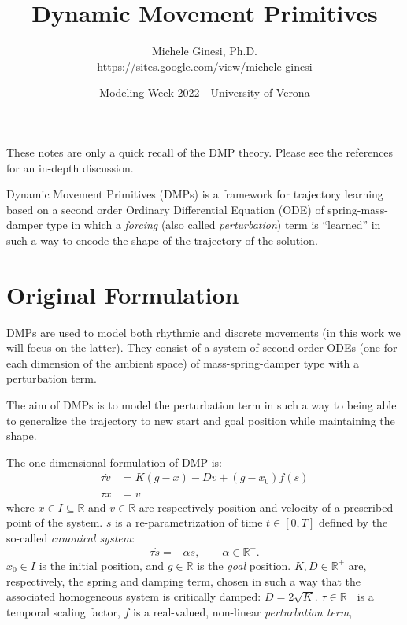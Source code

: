 \documentclass[fleqn, 11pt]{article}
\title{Dynamic Movement Primitives}
\author{Michele Ginesi, Ph.D. \\ \href{https://sites.google.com/view/michele-ginesi}{https://sites.google.com/view/michele-ginesi}}
\date{Modeling Week 2022 - University of Verona}
\theoremstyle{definition}
\theoremstyle{plain}
\theoremstyle{remark}
\begin{document}
\maketitle
\begin{center}
    These notes are only a quick recall of the DMP theory.
    Please see the references for an in-depth discussion.
\end{center}
\hrulefill

\vspace{0.5cm}
Dynamic Movement Primitives (DMPs) is a framework for trajectory learning based on a second order Ordinary Differential Equation (ODE) of spring-mass-damper type in which a \emph{forcing} (also called \emph{perturbation}) term is ``learned'' in such a way to encode the shape of the trajectory of the solution.

\section{Original Formulation}\label{subsec:dmp_old}

DMPs \cite{INS02, INS03} are used to model both rhythmic and discrete movements (in this work we will focus on the latter).
They consist of a system of second order ODEs (one for each dimension of the ambient space) of mass-spring-damper type with a perturbation term.

The aim of DMPs is to model the perturbation term in such a way to being able to generalize the trajectory to new start and goal position while maintaining the shape.

The one-dimensional formulation of DMP is:
\begin{subequations}
    \label{eqs:dmp_old_form}
    \begin{align}
        \tau \dot{v} & = K (g - x) - Dv + (g- x_0)f(s) \label{eq:dmp_old_form_acc}\\
        \tau \dot{x} & = v \label{eq:dmp_old_form_vel}
    \end{align}
\end{subequations}
where $ x \in I \subseteq \mathbb{R}$ and $v \in \mathbb{R} $ are respectively position and velocity of a prescribed point of the system.
$s$ is a re-parametrization of time $t \in [0, T]$ defined by the so-called \emph{canonical system}:
\begin{equation}\label{eq:DMPs_CS}
    \tau \dot{s} = -\alpha s,\qquad \alpha \in \mathbb{R}^+ .
\end{equation}
$x_0 \in I $ is the initial position, and $g \in \mathbb{R}$ is the \emph{goal} position.
$K, D \in \mathbb{R}^+$ are, respectively, the spring and damping term, chosen in such a way that the associated homogeneous system is critically damped: \( D = 2 \sqrt{K} \).
$\tau \in \mathbb{R}^+$ is a temporal scaling factor, $f$ is a real-valued, non-linear \emph{perturbation term},
\end{document}
